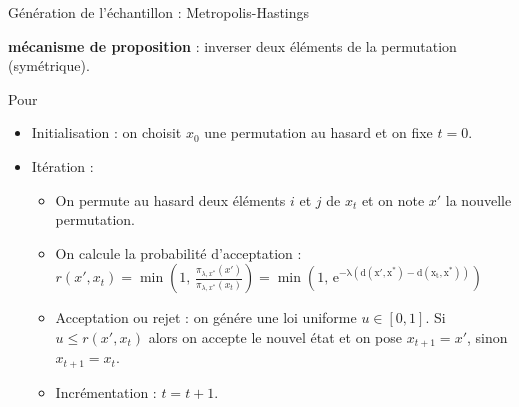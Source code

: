 \documentclass[10pt,xcolor=table,color={dvipsnames,usenames},ignorenonframetext,usepdftitle=false,french]{beamer}
\begin{document}
\begin{frame}{Génération de l'échantillon : Metropolis-Hastings}
\protect\hypertarget{guxe9nuxe9ration-de-luxe9chantillon-metropolis-hastings}{}

\faArrowCircleRight \textbf{ mécanisme de proposition} : inverser deux
éléments de la permutation (symétrique).

\pause

Pour

\begin{itemize}
\item Initialisation : on choisit $x_0$ une permutation au hasard et on fixe $t=0$.

\pause 

\item Itération : 
\begin{itemize}
\item On permute au hasard deux éléments $i$ et $j$ de $x_t$ et on note $x'$ la nouvelle permutation. 

\pause 

\item On calcule la probabilité d'acceptation : $r(x',x_t)=\min\left(1,\,\frac{\pi_{\lambda,x^*}(x')}{\pi_{\lambda,x^*}(x_{t})}\right)
=\min\left(1,\,\mathrm{e^{-\lambda(d(x',x^{*})-d(x_{t},x^{*}))}}\right)$  


\pause 

\item Acceptation ou rejet : on génére une loi uniforme $u\in[0,1]$. Si $u \leq r(x',x_{t}) $ alors on accepte le nouvel état et on pose $x_{t+1}=x'$, sinon $x_{t+1}=x_{t}$.

\pause 

\item Incrémentation : $t=t+1$.
\end{itemize}
\end{itemize}

\end{frame}
\end{document}
